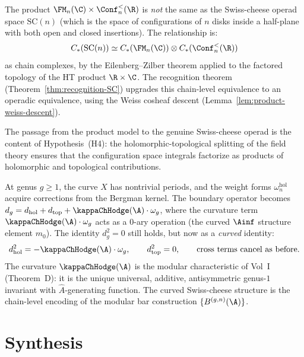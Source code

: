 \begin{remark}
The product $\FM_n(\C) \times \Conf_n^<(\R)$ is
\emph{not} the same as the Swiss-cheese operad space
$\mathrm{SC}(n)$ (which is the space of configurations
of $n$ disks inside a half-plane with both open and
closed insertions). The relationship is:
\[
C_\ast(\mathrm{SC}(n))
\simeq C_\ast(\FM_n(\C)) \otimes C_\ast(\Conf_n^<(\R))
\]
as chain complexes, by the Eilenberg--Zilber theorem
applied to the factored topology of the HT product
$\R \times \C$. The recognition theorem
(Theorem~\ref{thm:recognition-SC}) upgrades this
chain-level equivalence to an operadic equivalence,
using the Weiss cosheaf descent
(Lemma~\ref{lem:product-weiss-descent}).

The passage from the product model to the genuine
Swiss-cheese operad is the content of
Hypothesis~(H4): the holomorphic-topological splitting
of the field theory ensures that the configuration
space integrals factorize as products of holomorphic
and topological contributions.
\end{remark}

\begin{remark}
At genus $g \ge 1$, the curve $X$ has nontrivial periods,
and the weight forms $\omega_n^{\mathrm{hol}}$
acquire corrections from the Bergman kernel. The
boundary operator becomes
$d_g = d_{\mathrm{hol}} + d_{\mathrm{top}}
+ \kappaChHodge(\A) \cdot \omega_g$, where the curvature
term $\kappaChHodge(\A) \cdot \omega_g$ acts as a
$0$-ary operation (the curved $\Ainf$ structure
element $m_0$). The identity $d_g^2 = 0$ still holds,
but now as a \emph{curved} identity:
\[
d_{\mathrm{hol}}^2 = -\kappaChHodge(\A) \cdot \omega_g,
\qquad
d_{\mathrm{top}}^2 = 0,
\qquad
\text{cross terms cancel as before.}
\]
The curvature $\kappaChHodge(\A)$ is the modular
characteristic of Vol~I (Theorem~D): it is the unique
universal, additive, antisymmetric genus-$1$ invariant
with $\hat{A}$-generating function. The curved
Swiss-cheese structure is the chain-level encoding of
the modular bar construction $\{B^{(g,n)}(\A)\}$.
\end{remark}

\section{Synthesis}
\label{sec:fmcalc-ext-supplement}

